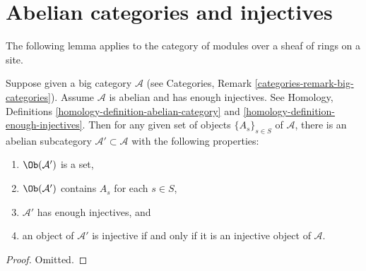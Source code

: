 \section{Abelian categories and injectives}
\label{section-abelian-categories-injectives}

\noindent
The following lemma applies to the category of modules over a sheaf
of rings on a site.

\begin{lemma}
\label{lemma-abelian-injectives}
Suppose given a big category $\mathcal{A}$ (see
Categories, Remark \ref{categories-remark-big-categories}).
Assume $\mathcal{A}$ is abelian and has enough injectives.
See Homology, Definitions \ref{homology-definition-abelian-category}
and \ref{homology-definition-enough-injectives}.
Then for any given set of objects $\{A_s\}_{s\in S}$
of $\mathcal{A}$, there is an abelian subcategory
$\mathcal{A}' \subset \mathcal{A}$
with the following properties:
\begin{enumerate}
\item $\Ob(\mathcal{A}')$ is a set,
\item $\Ob(\mathcal{A}')$ contains $A_s$ for each $s \in S$,
\item $\mathcal{A}'$ has enough injectives, and
\item an object of $\mathcal{A}'$ is injective if and only if it
is an injective object of $\mathcal{A}$.
\end{enumerate}
\end{lemma}

\begin{proof}
Omitted.
\end{proof}















